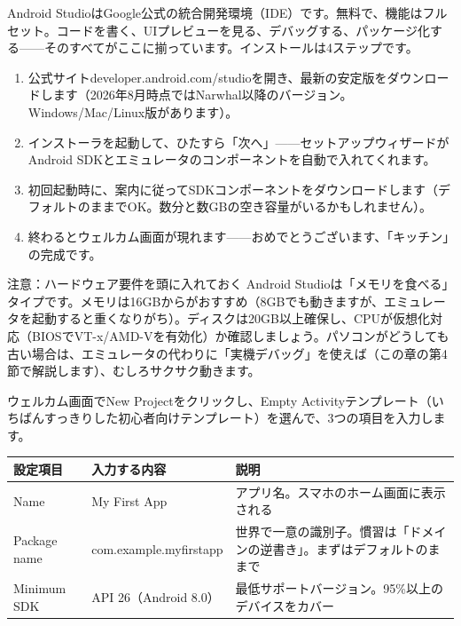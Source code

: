 


Android StudioはGoogle公式の統合開発環境（IDE）です。無料で、機能はフルセット。コードを書く、UIプレビューを見る、デバッグする、パッケージ化する——そのすべてがここに揃っています。インストールは4ステップです。

\begin{enumerate}
  \item 公式サイトdeveloper.android.com/studioを開き、最新の安定版をダウンロードします（2026年8月時点ではNarwhal以降のバージョン。Windows/Mac/Linux版があります）。
  \item インストーラを起動して、ひたすら「次へ」——セットアップウィザードがAndroid SDKとエミュレータのコンポーネントを自動で入れてくれます。
  \item 初回起動時に、案内に従ってSDKコンポーネントをダウンロードします（デフォルトのままでOK。数分と数GBの空き容量がいるかもしれません）。
  \item 終わるとウェルカム画面が現れます——おめでとうございます、「キッチン」の完成です。
\end{enumerate}

\begin{tcbwarn}{注意：ハードウェア要件を頭に入れておく}
Android Studioは「メモリを食べる」タイプです。メモリは16GBからがおすすめ（8GBでも動きますが、エミュレータを起動すると重くなりがち）。ディスクは20GB以上確保し、CPUが仮想化対応（BIOSでVT-x/AMD-Vを有効化）か確認しましょう。パソコンがどうしても古い場合は、エミュレータの代わりに「実機デバッグ」を使えば（この章の第4節で解説します）、むしろサクサク動きます。

\end{tcbwarn}


ウェルカム画面でNew Projectをクリックし、Empty Activityテンプレート（いちばんすっきりした初心者向けテンプレート）を選んで、3つの項目を入力します。

\begin{center}
\begin{tabularx}{\linewidth}{|X|X|X|}
\hline
\textbf{設定項目} & \textbf{入力する内容} & \textbf{説明} \tabularnewline
\hline
Name & My First App & アプリ名。スマホのホーム画面に表示される \tabularnewline
Package name & com.example.myfirstapp & 世界で一意の識別子。慣習は「ドメインの逆書き」。まずはデフォルトのままで \tabularnewline
Minimum SDK & API 26（Android 8.0） & 最低サポートバージョン。95\%以上のデバイスをカバー \tabularnewline
\hline
\end{tabularx}
\end{center}

